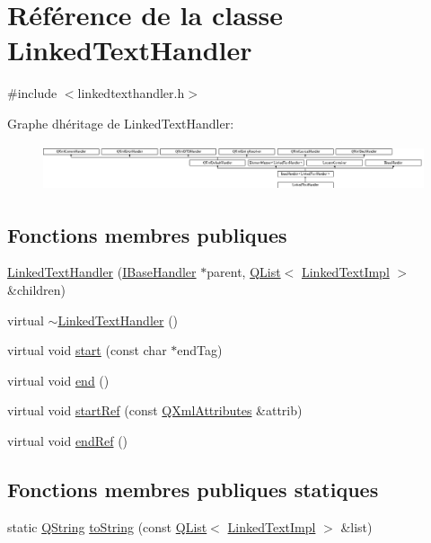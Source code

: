 \hypertarget{class_linked_text_handler}{}\section{Référence de la classe Linked\+Text\+Handler}
\label{class_linked_text_handler}


{\ttfamily \#include $<$linkedtexthandler.\+h$>$}

Graphe d\textquotesingle{}héritage de Linked\+Text\+Handler\+:\begin{figure}[H]
\begin{center}
\leavevmode
\includegraphics[height=1.350211cm]{class_linked_text_handler}
\end{center}
\end{figure}
\subsection*{Fonctions membres publiques}
\begin{DoxyCompactItemize}
\item 
\hyperlink{class_linked_text_handler_a8db5ab5dd37008669a0670d49b6d9b54}{Linked\+Text\+Handler} (\hyperlink{class_i_base_handler}{I\+Base\+Handler} $\ast$parent, \hyperlink{class_q_list}{Q\+List}$<$ \hyperlink{class_linked_text_impl}{Linked\+Text\+Impl} $>$ \&children)
\item 
virtual \hyperlink{class_linked_text_handler_a153976428ca8a87d9a5aec5e553c2d5e}{$\sim$\+Linked\+Text\+Handler} ()
\item 
virtual void \hyperlink{class_linked_text_handler_a6d13c856b056410266e0a580fbd2c9e9}{start} (const char $\ast$end\+Tag)
\item 
virtual void \hyperlink{class_linked_text_handler_ad01eee83b1454d199496a8815f8dab15}{end} ()
\item 
virtual void \hyperlink{class_linked_text_handler_a5b31e9440c0265e2c3894b42cf6197e1}{start\+Ref} (const \hyperlink{class_q_xml_attributes}{Q\+Xml\+Attributes} \&attrib)
\item 
virtual void \hyperlink{class_linked_text_handler_ac5900b57a7c05598d94d8d8015a1a3eb}{end\+Ref} ()
\end{DoxyCompactItemize}
\subsection*{Fonctions membres publiques statiques}
\begin{DoxyCompactItemize}
\item 
static \hyperlink{class_q_string}{Q\+String} \hyperlink{class_linked_text_handler_aafce861fdb6ee2aa4efb5415b33733e5}{to\+String} (const \hyperlink{class_q_list}{Q\+List}$<$ \hyperlink{class_linked_text_impl}{Linked\+Text\+Impl} $>$ \&list)
\end{DoxyCompactItemize}
